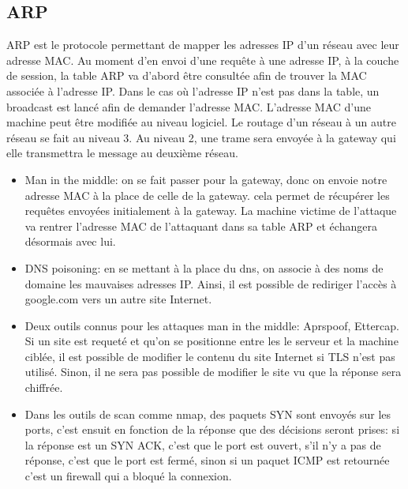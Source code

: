 \documentclass[12pt, oneside]{article}
\begin{document}
\subsection{ARP}
ARP est le protocole permettant de mapper les adresses IP d'un réseau avec leur adresse MAC. Au moment d'en envoi d'une requête à une adresse IP, à la couche de session, la table ARP va d'abord être consultée afin de trouver la MAC associée à l'adresse IP. Dans le cas où l'adresse IP n'est pas dans la table, un broadcast est lancé afin de demander l'adresse MAC.
L'adresse MAC d'une machine peut être modifiée au niveau logiciel. Le routage d'un réseau à un autre réseau se fait au niveau 3. Au niveau 2, une trame sera envoyée à la gateway qui elle transmettra le message au deuxième réseau.
\begin{itemize}
\item Man in the  middle: on se fait passer pour la gateway, donc on envoie notre adresse MAC à la place de celle de la gateway. cela permet de récupérer les requêtes envoyées initialement à la gateway. La machine victime de l'attaque va rentrer l'adresse MAC de l'attaquant dans sa table ARP et échangera désormais avec lui.
\item DNS poisoning: en se mettant à la place du dns, on associe à des noms de domaine les mauvaises adresses IP. Ainsi, il est possible de rediriger l'accès à google.com vers un autre site Internet.
\item Deux outils connus pour les attaques man in the middle: Aprspoof, Ettercap. Si un site est requeté et qu'on se positionne entre les le serveur et la machine ciblée, il est possible de modifier le contenu du site Internet si TLS n'est pas utilisé. Sinon, il ne sera pas possible de modifier le site vu que la réponse sera chiffrée.
\item Dans les outils de scan comme nmap, des paquets SYN sont envoyés sur les ports, c'est ensuit en fonction de la réponse que des décisions seront prises: si la réponse est un SYN ACK, c'est que le port est ouvert, s'il n'y a pas de réponse, c'est que le port est fermé, sinon si un paquet ICMP est retournée c'est un firewall qui a bloqué la connexion.
\end{itemize}
\end{document}
